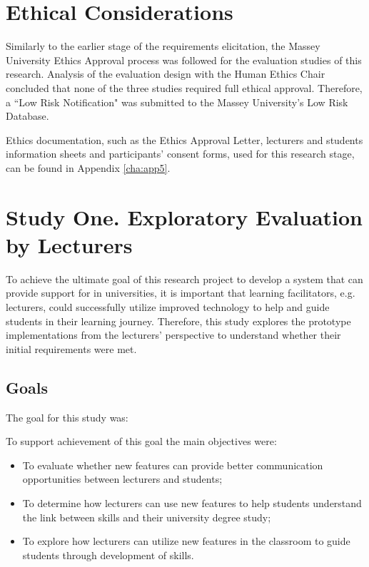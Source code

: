 \section{Ethical Considerations}

Similarly to the earlier stage of the requirements elicitation, the Massey
University Ethics Approval process was followed for the evaluation studies of
this research. Analysis of the evaluation design with the Human Ethics Chair
concluded that none of the three studies required full ethical approval.
Therefore, a ``Low Risk Notification" was submitted to the Massey University's
Low Risk Database.

Ethics documentation, such as the Ethics Approval Letter, lecturers and students
information sheets and participants' consent forms, used for this research
stage, can be found in Appendix \ref{cha:app5}.

\section{Study One. Exploratory Evaluation by Lecturers}
\label{sec:one}

To achieve the ultimate goal of this research project to develop a system that
can provide support for \LLLs in universities, it is important that learning
facilitators, e.g. lecturers, could successfully utilize improved technology to
help and guide students in their learning journey. Therefore, this study
explores the prototype implementations from the lecturers' perspective to
understand whether their initial requirements were met.

\subsection{Goals}

The goal for this study was:


To support achievement of this goal the main objectives were:

\begin{itemize}
  \item To evaluate whether new features can provide better communication
  opportunities between lecturers and students;
  \item To determine how lecturers can use new features to help students
  understand the link between \LLLs skills and their university degree study;
  \item To explore how lecturers can utilize new features in the classroom to
  guide students through development of \LLLs skills. 
\end{itemize}

